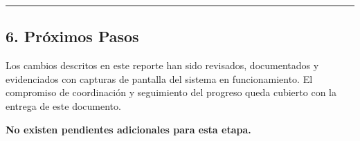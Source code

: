 \documentclass[
]{article}
\begin{document}
\begin{center}\rule{0.5\linewidth}{0.5pt}\end{center}

\subsection{6. Próximos Pasos}\label{pruxf3ximos-pasos}

Los cambios descritos en este reporte han sido revisados, documentados y
evidenciados con capturas de pantalla del sistema en funcionamiento. El
compromiso de coordinación y seguimiento del progreso queda cubierto con
la entrega de este documento.

\textbf{No existen pendientes adicionales para esta etapa.}
\end{document}
